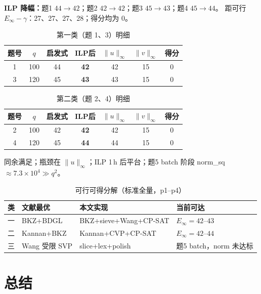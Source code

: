 \documentclass[12pt,a4paper]{ctexart}
\begin{document}
\noindent
\textbf{ILP 降幅：}题1 $44{\to}42$；题2 $42{\to}42$；题3 $45{\to}43$；题4 $45{\to}44$。
距可行 $E_\infty{-}\gamma$：27、27、27、28；得分均为 0。

\begin{table}[htbp]
  \centering
  \caption{第一类（题 1、3）明细}
  \label{tab:class1}
  \begin{tabular}{ccccccc}
    \toprule
    题号 & $q$ & 启发式 & ILP后 & $\|u\|_\infty$ & $\|v\|_\infty$ & 得分 \\
    \midrule
    1 & 100 & 44 & \textbf{42} & 42 & 15 & 0 \\
    3 & 120 & 45 & \textbf{43} & 43 & 15 & 0 \\
    \bottomrule
  \end{tabular}
\end{table}

\begin{table}[htbp]
  \centering
  \caption{第二类（题 2、4）明细}
  \label{tab:class2}
  \begin{tabular}{ccccccc}
    \toprule
    题号 & $q$ & 启发式 & ILP后 & $\|u\|_\infty$ & $\|v\|_\infty$ & 得分 \\
    \midrule
    2 & 100 & 42 & \textbf{42} & 42 & 15 & 0 \\
    4 & 120 & 45 & \textbf{44} & 44 & 15 & 0 \\
    \bottomrule
  \end{tabular}
\end{table}

同余满足；瓶颈在 $\|u\|_{\infty}$；ILP 1\,h 后平台；题5 batch 阶段 norm\_sq $\approx 7.3{\times}10^4 \gg q^2$。

\begin{table}[htbp]
  \centering
  \caption{可行可得分解（标准全量，p1--p4）}
  \label{tab:decomp}
  \small
  \begin{tabular}{p{1cm}p{3cm}p{3.6cm}p{3.8cm}}
    \toprule
    类 & 文献最优 & 本文实现 & 当前可达 \\
    \midrule
    一 & BKZ+BDGL & BKZ+sieve+Wang+CP-SAT & $E_\infty{=}42$--$43$ \\
    二 & Kannan+BKZ & Kannan+CVP+CP-SAT & $E_\infty{=}42$--$44$ \\
    三 & Wang 受限 SVP & slice+lex+polish & 题5 batch，norm 未达标 \\
    \bottomrule
  \end{tabular}
\end{table}

\section{总结}
\end{document}

